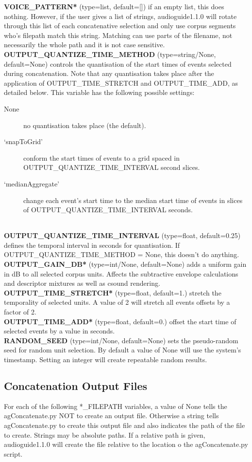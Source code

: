 \documentclass{article}
\newcommand{\optEntry}[4]{\textbf{#1} (type={\color{red}#2}, default={\color{ForestGreen}#3}) #4\hspace{0.5em}\\}
\newcommand{\ag}{audioguide1.1.0\xspace}
\begin{document}
\begin{spacing}{1.2}
\optEntry{VOICE\_PATTERN*}{list}{[]}{if an empty list, this does nothing.  However, if the user gives a list of strings, \ag will rotate through this list of each concatenative selection and only use corpus segments who's filepath match this string.  Matching can use parts of the filename, not necessarily the whole path and it is not case sensitive.}

\optEntry{OUTPUT\_QUANTIZE\_TIME\_METHOD}{string/None}{None}{controls the quantisation of the start times of events selected during concatenation.  Note that any quantisation takes place after the application of OUTPUT\_TIME\_STRETCH and OUTPUT\_TIME\_ADD, as detailed below.  This variable has the following possible settings:
\begin{description}
\item[None] no quantisation takes place (the default).
\item[`snapToGrid'] conform the start times of events to a grid spaced in OUTPUT\_QUANTIZE\_TIME\_INTERVAL second slices.
\item[`medianAggregate'] change each event's start time to the median start time of events in slices of OUTPUT\_QUANTIZE\_TIME\_INTERVAL seconds.  
\end{description}
}

\optEntry{OUTPUT\_QUANTIZE\_TIME\_INTERVAL}{float}{0.25}{defines the temporal interval in seconds for quantisation.  If OUTPUT\_QUANTIZE\_TIME\_METHOD = None, this doesn't do anything.}

\optEntry{OUTPUT\_GAIN\_DB*}{int/None}{None}{adds a uniform gain in dB to all selected corpus units.  Affects the subtractive envelope calculations and descriptor mixtures as well as csound rendering.}

\optEntry{OUTPUT\_TIME\_STRETCH*}{float}{1.}{stretch the temporality of selected units.  A value of 2 will stretch all events offsets by a factor of 2.}

\optEntry{OUTPUT\_TIME\_ADD*}{float}{0.}{offset the start time of selected events by a value in seconds.}

\optEntry{RANDOM\_SEED}{int/None}{None}{sets the pseudo-random seed for random unit selection.  By default a value of None will use the system's timestamp.  Setting an integer will create repeatable random results.}


\subsection{Concatenation Output Files}\label{outputfiles}
For each of the following *\_FILEPATH variables, a value of None tells the agConcatenate.py NOT to create an output file.  Otherwise a string tells agConcatenate.py to create this output file and also indicates the path of the file to create.  Strings may be absolute paths.  If a relative path is given, \ag will create the file relative to the location o the agConcatenate.py script.


\end{spacing}
\end{document}
